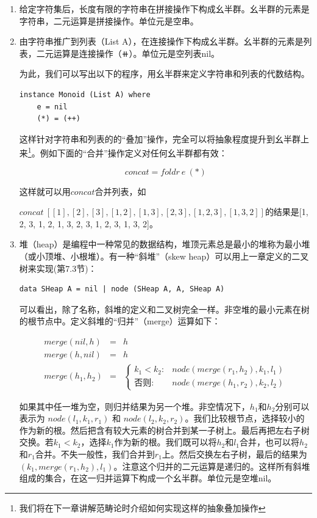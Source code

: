 \documentclass{article}
\begin{document}
\begin{enumerate}
\item 给定字符集后，长度有限的字符串在拼接操作下构成幺半群。幺半群的元素是字符串，二元运算是拼接操作。单位元是空串。
\item 由字符串推广到列表（List A），在连接操作下构成幺半群。幺半群的元素是列表，二元运算是连接操作（$\doubleplus$）。单位元是空列表nil。

为此，我们可以写出以下的程序，用幺半群来定义字符串和列表的代数结构。

\begin{lstlisting}
instance Monoid (List A) where
    e = nil
    (*) = (++)
\end{lstlisting}

这样针对字符串和列表的的“叠加”操作，完全可以将抽象程度提升到幺半群上来\footnote{我们将在下一章讲解范畴论时介绍如何实现这样的抽象叠加操作}。例如下面的“合并”操作定义对任何幺半群都有效：

\[
concat = foldr\ e\ (*)
\]

这样就可以用$concat$合并列表，如

$concat\ [[1], [2], [3], [1, 2], [1, 3], [2, 3], [1, 2, 3], [1, 3, 2]]$的结果是[1, 2, 3, 1, 2, 1, 3, 2, 3, 1, 2, 3, 1, 3, 2]。

\item 堆（heap）是编程中一种常见的数据结构，堆顶元素总是最小的堆称为最小堆（或小顶堆、小根堆）。有一种“斜堆”（skew heap）可以用上一章定义的二叉树来实现(\cite{LiuXinyu2017}第7.3节)：

\begin{lstlisting}
data SHeap A = nil | node (SHeap A, A, SHeap A)
\end{lstlisting}

可以看出，除了名称，斜堆的定义和二叉树完全一样。非空堆的最小元素在树的根节点中。定义斜堆的“归并”（merge）运算如下：

\[
\begin{array}{rcl}
merge(nil, h) & = & h \\
merge(h, nil) & = & h \\
merge(h_1, h_2) & = &
  \begin{cases}
  k_1 < k_2 : & node(merge(r_1, h_2), k_1, l_1) \\
  \text{否则}: & node(merge(h_1, r_2), k_2, l_2)
  \end{cases}
\end{array}
\]

如果其中任一堆为空，则归并结果为另一个堆。非空情况下，$h_1$和$h_2$分别可以表示为 $node(l_1, k_1, r_1)$ 和 $node(l_2, k_2, r_2)$。我们比较根节点，选择较小的作为新的根。然后把含有较大元素的树合并到某一子树上。最后再把左右子树交换。若$k_1 < k_2$，选择$k_1$作为新的根。我们既可以将$h_2$和$l_1$合并，也可以将$h_2$和$r_1$合并。不失一般性，我们合并到$r_1$上。然后交换左右子树，最后的结果为$(k_1, merge(r_1, h_2), l_1)$。注意这个归并的二元运算是递归的。这样所有斜堆组成的集合，在这一归并运算下构成一个幺半群。单位元是空堆nil。


\end{enumerate}
\end{document}

